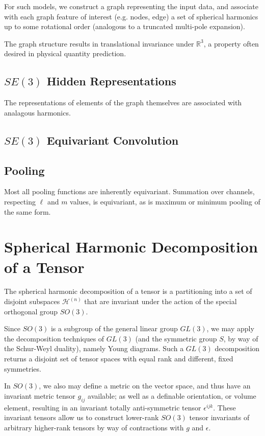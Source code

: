 \documentclass[10pt,a4paper]{article}
\begin{document}
For such models, we construct a graph representing the input data, and associate with each graph feature of interest (e.g. nodes, edge) a set of spherical harmonics up to some rotational order (analogous to a truncated multi-pole expansion).

The graph structure results in translational invariance under $\mathbb{R}^3$, a property often desired in physical quantity prediction. 

\subsection{$SE(3)$ Hidden Representations}
The representations of elements of the graph themselves are associated with analagous harmonics.

\subsection{$SE(3)$ Equivariant Convolution}

\subsection{Pooling}
Most all pooling functions are inherently equivariant. Summation over channels, respecting $\ell$ and $m$ values, is equivariant, as is maximum or minimum pooling of the same form.

\section{Spherical Harmonic Decomposition of a Tensor}
The spherical harmonic decomposition of a tensor is a partitioning into a set of disjoint subspaces $\mathcal{H}^{(n)}$ that are invariant under the action of the special orthogonal group $SO(3)$. 

Since $SO(3)$ is a subgroup of the general linear group $GL(3)$, we may apply the decomposition techniques of $GL(3)$ (and the symmetric group $S$, by way of the Schur-Weyl duality), namely Young diagrams. Such a $GL(3) $ decomposition returns a disjoint set of tensor spaces with equal rank and different, fixed symmetries.  


In $SO(3)$, we also may define a metric on the vector space, and thus have an invariant metric tensor $g_{ij}$ available; as well as a definable orientation, or volume element, resulting in an invariant totally anti-symmetric tensor $\epsilon^{ijk}$. These invariant tensors allow us to construct lower-rank $SO(3)$ tensor invariants of arbitrary higher-rank tensors by way of contractions with $g$ and $\epsilon$.
\end{document}
